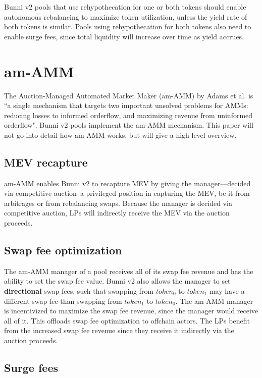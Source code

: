 \documentclass[twocolumn]{article}
\begin{document}
Bunni v2 pools that use rehypothecation for one or both tokens should enable autonomous rebalancing to maximize token utilization, unless the yield rate of both tokens is similar. Pools using rehypothecation for both tokens also need to enable surge fees, since total liquidity will increase over time as yield accrues.

\section{am-AMM}

The Auction-Managed Automated Market Maker (am-AMM) by Adams et al. \cite{adams2024amamm} is ``a single mechanism that targets two important unsolved problems for AMMs: reducing losses to informed orderflow, and maximizing revenue from uninformed orderflow". Bunni v2 pools implement the am-AMM mechanism. This paper will not go into detail how am-AMM works, but will give a high-level overview.

\subsection{MEV recapture}

am-AMM enables Bunni v2 to recapture MEV by giving the manager—decided via competitive auction–a privileged position in capturing the MEV, be it from arbitrages or from rebalancing swaps. Because the manager is decided via competitive auction, LPs will indirectly receive the MEV via the auction proceeds.

\subsection{Swap fee optimization}

The am-AMM manager of a pool receives all of its swap fee revenue and has the ability to set the swap fee value. Bunni v2 also allows the manager to set \textbf{directional} swap fees, such that swapping from $token_0$ to $token_1$ may have a different swap fee than swapping from $token_1$ to $token_0$. The am-AMM manager is incentivized to maximize the swap fee revenue, since the manager would receive all of it. This offloads swap fee optimization to offchain actors. The LPs benefit from the increased swap fee revenue since they receive it indirectly via the auction proceeds.  

\subsection{Surge fees}
\end{document}
